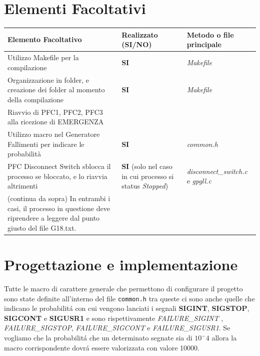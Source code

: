 \documentclass[11pt, oneside]{article}   	%
\begin{document}
\section{Elementi Facoltativi}
\begin{tabular}{|p{}|p{}|p{}|}
	\hline 
	\textbf{Elemento Facoltativo} & \textbf{Realizzato (SI/NO)} & \textbf{Metodo o file principale}\\
	\hline
	Utilizzo Makefile per la compilazione & \textbf{SI} & \textit{Makefile}\\
	\hline
	Organizzazione in folder, e creazione dei folder al momento della compilazione & \textbf{SI} & \textit{Makefile} \\
	\hline
	Riavvio di PFC1, PFC2, PFC3 alla ricezione di EMERGENZA &  & \\
	\hline
	Utilizzo macro nel Generatore Fallimenti per indicare le probabilità & \textbf{SI} & \textit{common.h} \\
	\hline
	PFC Disconnect Switch sblocca il processo se bloccato, e lo riavvia altrimenti & \textbf{SI} (solo nel caso in cui processo si status \textit{Stopped}) & \textit{disconnect\_switch.c} e \textit{gpgll.c}\\
	\hline
	(continua da sopra) In entrambi i casi, il processo in questione deve riprendere a leggere dal punto giusto del file G18.txt. & & \\
	\hline
\end{tabular}


\section{Progettazione e implementazione}
Tutte le macro di carattere generale che permettono di configurare il progetto sono state definite all'interno del file \texttt{common.h} tra queste ci sono anche quelle che indicano le probabilit\'a con cui vengono lanciati i segnali \textbf{SIGINT}, \textbf{SIGSTOP}, \textbf{SIGCONT} e \textbf{SIGUSR1} e sono rispettivamente \textit{FAILURE\_SIGINT }, \textit{FAILURE\_SIGSTOP}, \textit{FAILURE\_SIGCONT} e \textit{FAILURE\_SIGUSR1}. Se vogliamo  che la probabilit\'a che un determinato segnate sia di $10^-4$ allora la macro corrispondente dovr\'a essere valorizzata con valore 10000.\par  
\end{document}
